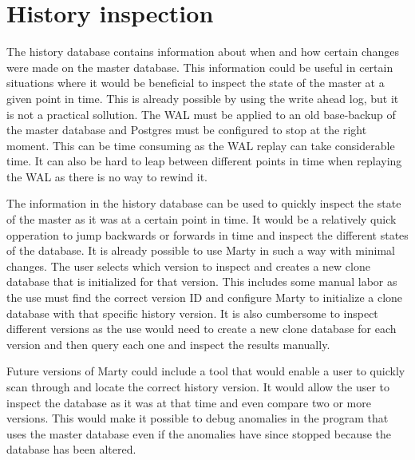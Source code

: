 \section{History inspection}
The history database contains information about when and how certain changes were made on the master database.
This information could be useful in certain situations where it would be beneficial to inspect the state of the master at a given point in time.
This is already possible by using the write ahead log, but it is not a practical sollution.
The WAL must be applied to an old base-backup of the master database and Postgres must be configured to stop at the right moment.
This can be time consuming as the WAL replay can take considerable time.
It can also be hard to leap between different points in time when replaying the WAL as there is no way to rewind it.

The information in the history database can be used to quickly inspect the state of the master as it was at a certain point in time.
It would be a relatively quick opperation to jump backwards or forwards in time and inspect the different states of the database.
It is already possible to use Marty in such a way with minimal changes.
The user selects which version to inspect and creates a new clone database that is initialized for that version.
This includes some manual labor as the use must find the correct version ID and configure Marty to initialize a clone database with that specific history version.
It is also cumbersome to inspect different versions as the use would need to create a new clone database for each version and then query each one and inspect the results manually.

Future versions of Marty could include a tool that would enable a user to quickly scan through and locate the correct history version.
It would allow the user to inspect the database as it was at that time and even compare two or more versions.
This would make it possible to debug anomalies in the program that uses the master database even if the anomalies have since stopped because the database has been altered.